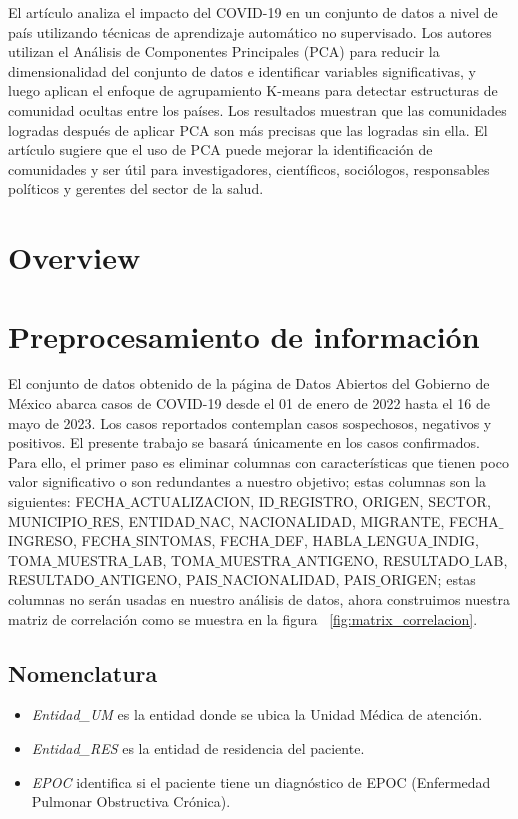 \documentclass[a4paper,
               ]{jacow}
\begin{document}
El artículo \cite{Chaudhary2021} analiza el impacto del COVID-19 en un conjunto de datos a nivel de país utilizando técnicas de aprendizaje automático no supervisado. Los autores utilizan el Análisis de Componentes Principales (PCA) para reducir la dimensionalidad del conjunto de datos e identificar variables significativas, y luego aplican el enfoque de agrupamiento K-means para detectar estructuras de comunidad ocultas entre los países. Los resultados muestran que las comunidades logradas después de aplicar PCA son más precisas que las logradas sin ella. El artículo sugiere que el uso de PCA puede mejorar la identificación de comunidades y ser útil para investigadores, científicos, sociólogos, responsables políticos y gerentes del sector de la salud.

\section{Overview}

\section{Preprocesamiento de información}
El conjunto de datos obtenido de la página de Datos Abiertos del Gobierno de México abarca casos de COVID-19 desde el 01 de enero de 2022 hasta el 16 de mayo de 2023. Los casos reportados contemplan casos sospechosos, negativos y positivos. El presente trabajo se basará únicamente en los casos confirmados. Para ello, el primer paso es eliminar columnas con características que tienen poco valor significativo o son redundantes a nuestro objetivo; estas columnas son la siguientes: FECHA$\_$ACTUALIZACION, ID$\_$REGISTRO, ORIGEN, SECTOR, MUNICIPIO$\_$RES, ENTIDAD$\_$NAC, NACIONALIDAD, MIGRANTE, FECHA$\_$INGRESO, FECHA$\_$SINTOMAS, FECHA$\_$DEF, HABLA$\_$LENGUA$\_$INDIG, TOMA$\_$MUESTRA$\_$LAB, TOMA$\_$MUESTRA$\_$ANTIGENO, RESULTADO$\_$LAB, RESULTADO$\_$ANTIGENO, PAIS$\_$NACIONALIDAD, PAIS$\_$ORIGEN; estas columnas no serán usadas en nuestro análisis de datos, ahora construimos nuestra matriz de correlación como se muestra en la figura  ~\ref{fig:matrix_correlacion}.

\subsection{Nomenclatura}

\begin{itemize}[label=--]
\item \emph{Entidad_UM} es la entidad donde se ubica la Unidad Médica de atención.
\item \emph{Entidad_RES} es la entidad de residencia del paciente.
\item \emph{EPOC} identifica si el paciente tiene un diagnóstico de EPOC (Enfermedad Pulmonar Obstructiva Crónica).
\end{itemize}
\end{document}
